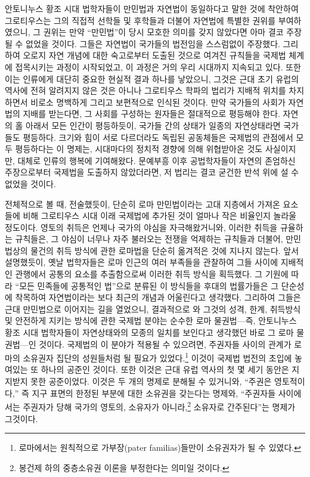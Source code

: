 안토니누스 황조 시대 법학자들이 만민법과 자연법이 동일하다고 말한 것에
착안하여
그로티우스는 그의 직접적 선학들 및 후학들과 더불어
자연법에 특별한 권위를 부여하였으니,
그 권위는 만약 ``만민법''이 당시 모호한 의미를 갖지 않았다면
아마 결코 주장될 수 없었을 것이다.
그들은 자연법이 국가들의 법전임을 스스럼없이 주장했다.
그리하여
오로지 자연 개념에 대한 숙고로부터 도출된 것으로 여겨진 규칙들을
국제법 체계에 접목시키는 과정이 시작되었고,
이 과정은 거의 우리 시대까지 지속되고 있다.
또한 이는 인류에게 대단히 중요한 현실적 결과 하나를 낳았으니,
그것은 근대 초기 유럽의 역사에 전혀 알려지지 않은 것은 아니나
그로티우스 학파의 법리가 지배적 위치를 차지하면서 비로소
명백하게 그리고 보편적으로 인식된 것이다.
만약 국가들의 사회가 자연법의 지배를 받는다면,
그 사회를 구성하는 원자들은 절대적으로 평등해야 한다.
자연의 홀 아래서 모든 인간이 평등하듯이,
국가들 간의 상태가 일종의 자연상태라면 국가들도 평등하다.
크기와 힘이 서로 다르더라도 독립된 공동체들은
국제법의 관점에서 모두 평등하다는 이 명제는,
시대마다의 정치적 경향에 의해 위협받아온 것도 사실이지만,
대체로 인류의 행복에 기여해왔다.
문예부흥 이후 공법학자들이
자연의 존엄하신 주장으로부터 국제법을 도출하지 않았더라면,
저 법리는 결코 굳건한 반석 위에 설 수 없었을 것이다.

전체적으로 볼 때, 전술했듯이,
단순히 로마 만민법이라는 고대 지층에서 가져온 요소들에 비해
그로티우스 시대 이래 국제법에 추가된 것이
얼마나 작은 비율인지 놀라울 정도이다.
영토의 취득은 언제나 국가의 야심을 자극해왔거니와,
이러한 취득을 규율하는 규칙들은,
그 야심이 너무나 자주 불러오는 전쟁을 억제하는 규칙들과 더불어,
만민법상의 물건의 취득 방식에 관한 로마법을
단순히 옮겨적은 것에 지나지 않는다.
앞서 설명했듯이,
옛날 법학자들은
로마 인근의 여러 부족들을 관찰하여 그들 사이에 지배적인 관행에서
공통의 요소를 추출함으로써
이러한 취득 방식을
획득했다.
그 기원에 따라
``모든 민족들에 공통적인 법''으로 분류된 이 방식들을
후대의 법률가들은
그 단순성에 착목하여 자연법이라는 보다 최근의 개념과 어울린다고 생각했다.
그리하여 그들은 근대 만민법으로 이어지는
길을 열었으니, 결과적으로
와 그것의 성격, 한계, 취득방식 및
안전하게 지키는 방식에 관한 국제법 분야는
순수한 로마 물권법---즉,
안토니누스 황조 시대 법학자들이 자연상태와의 모종의 일치를 보인다고
생각했던 바로 그 로마 물권법---인 것이다.
국제법의 이 분야가 적용될 수 있으려면,
주권자들 사이의 관계가
로마의 소유권자 집단의 성원들처럼 될 필요가
있었다.\footnote{로마에서는
원칙적으로 가부장(pater familias)들만이 소유권자가 될 수 있였다.}
이것이 국제법 법전의 초입에 놓여있는 또 하나의 공준인 것이다.
또한 이것은 근대 유럽 역사의 첫 몇 세기 동안은 지지받지 못한 공준이었다.
이것은 두 개의 명제로 분해될 수 있거니와,
``주권은 영토적이다,'' 즉
지구 표면의 한정된 부분에 대한 소유권을 갖는다는 명제와,
``주권자들 사이에서는 주권자가 당해 국가의 영토의,
 소유자가 아니라,\footnote{봉건제 하의
중층소유권 이론을 부정한다는 의미일 것이다.}
 소유자로 간주된다''는 명제가
그것이다.

